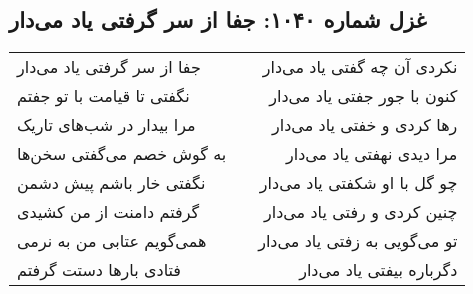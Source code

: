 \begin{center}
\section*{غزل شماره ۱۰۴۰: جفا از سر گرفتی یاد می‌دار}
\label{sec:1040}
\begin{longtable}{l p{0.5cm} r}
جفا از سر گرفتی یاد می‌دار
&&
نکردی آن چه گفتی یاد می‌دار
\\
نگفتی تا قیامت با تو جفتم
&&
کنون با جور جفتی یاد می‌دار
\\
مرا بیدار در شب‌های تاریک
&&
رها کردی و خفتی یاد می‌دار
\\
به گوش خصم می‌گفتی سخن‌ها
&&
مرا دیدی نهفتی یاد می‌دار
\\
نگفتی خار باشم پیش دشمن
&&
چو گل با او شکفتی یاد می‌دار
\\
گرفتم دامنت از من کشیدی
&&
چنین کردی و رفتی یاد می‌دار
\\
همی‌گویم عتابی من به نرمی
&&
تو می‌گویی به زفتی یاد می‌دار
\\
فتادی بارها دستت گرفتم
&&
دگرباره بیفتی یاد می‌دار
\\
\end{longtable}
\end{center}
